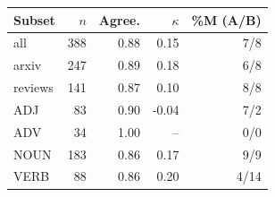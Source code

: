 \begin{tabular}{lrrrr}
\toprule
Subset & $n$ & Agree. & $\kappa$ & \%M (A/B) \\
\midrule
all & 388 & 0.88 & 0.15 & 7/8 \\
arxiv & 247 & 0.89 & 0.18 & 6/8 \\
reviews & 141 & 0.87 & 0.10 & 8/8 \\
ADJ & 83 & 0.90 & -0.04 & 7/2 \\
ADV & 34 & 1.00 & -- & 0/0 \\
NOUN & 183 & 0.86 & 0.17 & 9/9 \\
VERB & 88 & 0.86 & 0.20 & 4/14 \\
\bottomrule
\end{tabular}
